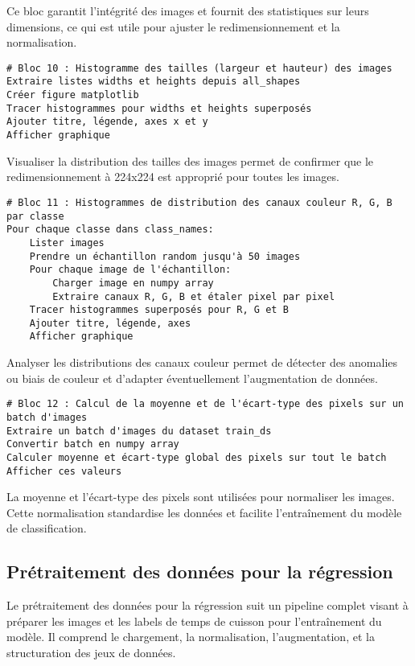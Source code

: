 Ce bloc garantit l’intégrité des images et fournit des statistiques sur leurs dimensions, ce qui est utile pour ajuster le redimensionnement et la normalisation.

\begin{verbatim}
# Bloc 10 : Histogramme des tailles (largeur et hauteur) des images
Extraire listes widths et heights depuis all_shapes
Créer figure matplotlib
Tracer histogrammes pour widths et heights superposés
Ajouter titre, légende, axes x et y
Afficher graphique
\end{verbatim}

Visualiser la distribution des tailles des images permet de confirmer que le redimensionnement à 224x224 est approprié pour toutes les images.

\begin{verbatim}
# Bloc 11 : Histogrammes de distribution des canaux couleur R, G, B par classe
Pour chaque classe dans class_names:
    Lister images
    Prendre un échantillon random jusqu'à 50 images
    Pour chaque image de l'échantillon:
        Charger image en numpy array
        Extraire canaux R, G, B et étaler pixel par pixel
    Tracer histogrammes superposés pour R, G et B
    Ajouter titre, légende, axes
    Afficher graphique
\end{verbatim}

Analyser les distributions des canaux couleur permet de détecter des anomalies ou biais de couleur et d’adapter éventuellement l’augmentation de données.

{
\small
\begin{verbatim}
# Bloc 12 : Calcul de la moyenne et de l'écart-type des pixels sur un batch d'images
Extraire un batch d'images du dataset train_ds
Convertir batch en numpy array
Calculer moyenne et écart-type global des pixels sur tout le batch
Afficher ces valeurs
\end{verbatim}}

La moyenne et l’écart-type des pixels sont utilisées pour normaliser les images. Cette normalisation standardise les données et facilite l’entraînement du modèle de classification.

\subsection{Prétraitement des données pour la régression}

Le prétraitement des données pour la régression suit un pipeline complet visant à préparer les images et les labels de temps de cuisson pour l’entraînement du modèle. Il comprend le chargement, la normalisation, l’augmentation, et la structuration des jeux de données.

